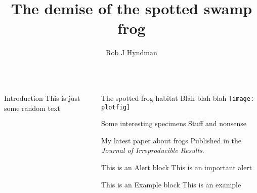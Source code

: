 \documentclass[final]{beamer}
\title{The demise of the spotted swamp frog}
\author{Rob J Hyndman}
\date{}
\begin{document}
\begin{frame}
  \vfill
  \begin{columns}[t]
    \begin{column}[t]{0.24\linewidth}
      \begin{block}{Introduction}
        This is just some random text
      \end{block}
    \end{column}
    \begin{column}[t]{0.75\linewidth}
      \begin{block}{The spotted frog habitat}
        Blah blah blah
        \texttt{[image: plotfig]}
      \end{block}
      
      \begin{block}{Some interesting specimens}
        Stuff and nonsense
      \end{block}
      
      \begin{block}{My latest paper about frogs}
        Published in the \emph{Journal of Irreproducible Results}.
      \end{block}

   \begin{alertblock}{This is an Alert block}
   This is an important alert
   \end{alertblock}
 
   \begin{exampleblock}{This is an Example block}
   This is an example 
   \end{exampleblock}

      \end{column}
    \end{columns}
  \end{frame}
\end{document}
